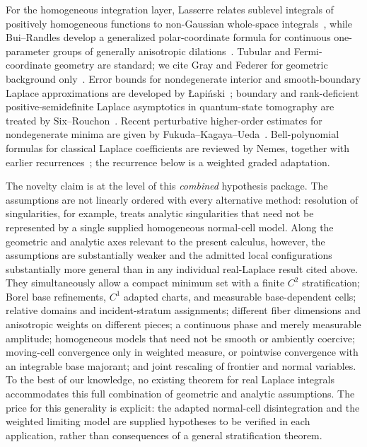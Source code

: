 \documentclass[11pt]{amsart}
\numberwithin{equation}{section}
\theoremstyle{definition}
\theoremstyle{remark}
\begin{document}
For the homogeneous integration layer, Lasserre relates sublevel integrals of
positively homogeneous functions to non-Gaussian whole-space
integrals~\cite{Lasserre}, while Bui--Randles develop a generalized
polar-coordinate formula for continuous one-parameter groups of generally
anisotropic dilations~\cite{BuiRandles}.  Tubular and Fermi-coordinate geometry
are standard; we cite Gray and Federer for geometric background
only~\cite{GrayTubes,Federer}.  Error bounds for nondegenerate interior and
smooth-boundary Laplace approximations are developed by
\L{}api\'nski~\cite{Lapinski}; boundary and rank-deficient positive-semidefinite
Laplace asymptotics in quantum-state tomography are treated by
Six--Rouchon~\cite{SixRouchon}.  Recent perturbative higher-order estimates for
nondegenerate minima are given by
Fukuda--Kagaya--Ueda~\cite{FukudaKagayaUeda}.  Bell-polynomial formulas for
classical Laplace coefficients are reviewed by Nemes, together with earlier
recurrences~\cite{Nemes}; the recurrence below is a weighted graded adaptation.

The novelty claim is at the level of this \emph{combined} hypothesis package.
The assumptions are not linearly ordered with every alternative method:
resolution of singularities, for example, treats analytic singularities that
need not be represented by a single supplied homogeneous normal-cell model.
Along the geometric and analytic axes relevant to the present calculus,
however, the assumptions are substantially weaker and the admitted local
configurations substantially more general than in any individual real-Laplace
result cited above.  They simultaneously allow a compact minimum set with a
finite $C^2$ stratification; Borel base refinements, $C^1$ adapted charts, and
measurable base-dependent cells; relative domains and incident-stratum
assignments; different fiber dimensions and anisotropic weights on different
pieces; a continuous phase and merely measurable amplitude; homogeneous models
that need not be smooth or ambiently coercive; moving-cell convergence only in
weighted measure, or pointwise convergence with an integrable base majorant;
and joint rescaling of frontier and normal variables.  To the best of our
knowledge, no existing theorem for real Laplace integrals accommodates this
full combination of geometric and analytic assumptions.  The price for this
generality is explicit: the adapted normal-cell disintegration and the weighted
limiting model are supplied hypotheses to be verified in each application,
rather than consequences of a general stratification theorem.
\end{document}
